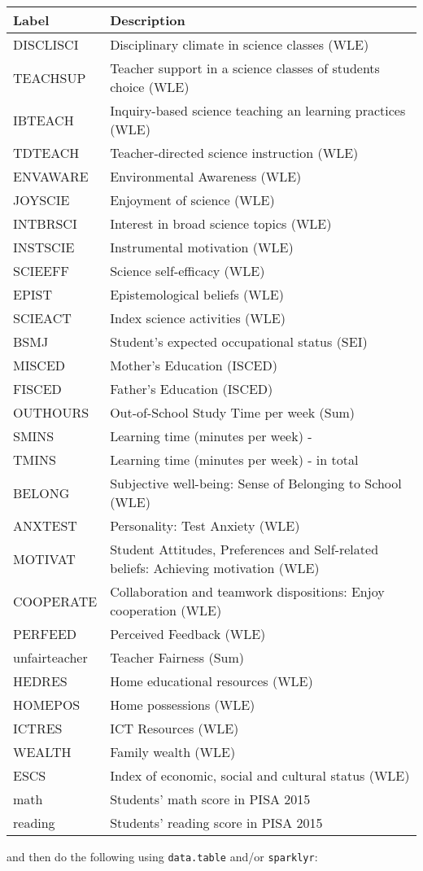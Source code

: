 \documentclass[
]{book}
\begin{document}
\begin{longtable}[]{@{}ll@{}}
\toprule
Label & Description\tabularnewline
\midrule
\endhead
DISCLISCI & Disciplinary climate in science classes (WLE)\tabularnewline
TEACHSUP & Teacher support in a science classes of students choice (WLE)\tabularnewline
IBTEACH & Inquiry-based science teaching an learning practices (WLE)\tabularnewline
TDTEACH & Teacher-directed science instruction (WLE)\tabularnewline
ENVAWARE & Environmental Awareness (WLE)\tabularnewline
JOYSCIE & Enjoyment of science (WLE)\tabularnewline
INTBRSCI & Interest in broad science topics (WLE)\tabularnewline
INSTSCIE & Instrumental motivation (WLE)\tabularnewline
SCIEEFF & Science self-efficacy (WLE)\tabularnewline
EPIST & Epistemological beliefs (WLE)\tabularnewline
SCIEACT & Index science activities (WLE)\tabularnewline
BSMJ & Student's expected occupational status (SEI)\tabularnewline
MISCED & Mother's Education (ISCED)\tabularnewline
FISCED & Father's Education (ISCED)\tabularnewline
OUTHOURS & Out-of-School Study Time per week (Sum)\tabularnewline
SMINS & Learning time (minutes per week) - \tabularnewline
TMINS & Learning time (minutes per week) - in total\tabularnewline
BELONG & Subjective well-being: Sense of Belonging to School (WLE)\tabularnewline
ANXTEST & Personality: Test Anxiety (WLE)\tabularnewline
MOTIVAT & Student Attitudes, Preferences and Self-related beliefs: Achieving motivation (WLE)\tabularnewline
COOPERATE & Collaboration and teamwork dispositions: Enjoy cooperation (WLE)\tabularnewline
PERFEED & Perceived Feedback (WLE)\tabularnewline
unfairteacher & Teacher Fairness (Sum)\tabularnewline
HEDRES & Home educational resources (WLE)\tabularnewline
HOMEPOS & Home possessions (WLE)\tabularnewline
ICTRES & ICT Resources (WLE)\tabularnewline
WEALTH & Family wealth (WLE)\tabularnewline
ESCS & Index of economic, social and cultural status (WLE)\tabularnewline
math & Students' math score in PISA 2015\tabularnewline
reading & Students' reading score in PISA 2015\tabularnewline
\bottomrule
\end{longtable}

and then do the following using \texttt{data.table} and/or \texttt{sparklyr}:
\end{document}
